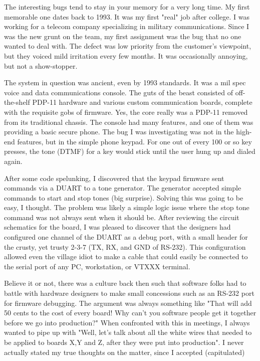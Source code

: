 The interesting bugs tend to stay in your memory for a very long time. My first
memorable one dates back to 1993. It was my first "real" job after college. I was
working for a telecom company specializing in military communications. Since I
was the new grunt on the team, my first assignment was the bug that no one
wanted to deal with. The defect was low priority from the customer's viewpoint,
but they voiced mild irritation every few months. It was occasionally annoying,
but not a show-stopper.
\par
The system in question was ancient, even by 1993 standards. It was a mil spec
voice and data communications console. The guts of the beast consisted of
off-the-shelf PDP-11 hardware and various custom communication boards, complete
with the requisite gobs of firmware. Yes, the core really was a PDP-11 removed
from its traditional chassis. The console had many features, and one of them was
providing a basic secure phone. The bug I was investigating was not in the
high-end features, but in the simple phone keypad. For one out of every 100 or
so key presses, the tone (DTMF) for a key would stick until the user hung up and
dialed again.
\par
After some code spelunking, I discovered that the keypad firmware sent commands
via a DUART to a tone generator. The generator accepted simple commands to start
and stop tones (big surprise). Solving this was going to be easy, I thought. The
problem was likely a simple logic issue where the stop tone command was not
always sent when it should be. After reviewing the circuit schematics for the
board, I was pleased to discover that the designers had configured one channel
of the DUART as a debug port, with a small header for the crusty, yet trusty
2-3-7 (TX, RX, and GND of RS-232). This configuration allowed even the village
idiot to make a cable that could easily be connected to the serial port of any
PC, workstation, or VTXXX terminal.
\par
Believe it or not, there was a culture back then such that software folks had to
battle with hardware designers to make small concessions such as an RS-232 port
for firmware debugging. The argument was always something like "That will add 50
cents to the cost of every board! Why can't you software people get it together
before we go into production?" When confronted with this in meetings, I always
wanted to pipe up with "Well, let's talk about all the white wires that needed
to be applied to boards X,Y and Z, after they were put into production". I never
actually stated my true thoughts on the matter, since I accepted (capitulated)
